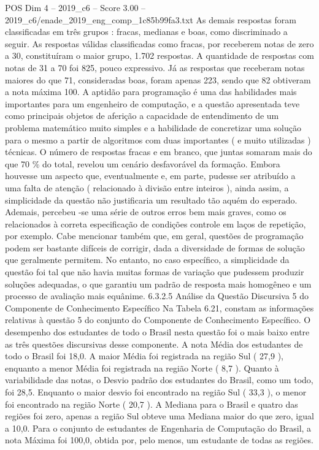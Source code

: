 \begin{textsample}{POS Dim 4 – 2019\_c6 – Score 3.00 – 2019\_c6/enade\_2019\_eng\_comp\_1c85b99fa3.txt}
As demais respostas foram classificadas em três grupos : fracas, medianas e boas, como discriminado a seguir.
As respostas válidas classificadas como fracas, por receberem notas de zero a 30, constituíram o maior grupo, 1.702 respostas.
A quantidade de respostas com notas de 31 a 70 foi 825, pouco expressivo.
Já as respostas que receberam notas maiores do que 71, consideradas boas, foram apenas 223, sendo que 82 obtiveram a nota máxima 100.
A aptidão para programação é uma das habilidades mais importantes para um engenheiro de computação, e a questão apresentada teve como principais objetos de aferição a capacidade de entendimento de um problema matemático muito simples e a habilidade de concretizar uma solução para o mesmo a partir de algoritmos com duas importantes ( e muito utilizadas ) técnicas.
O número de respostas fracas e em branco, que juntas somaram mais do que 70 \% do total, revelou um cenário desfavorável da formação.
Embora houvesse um aspecto que, eventualmente e, em parte, pudesse ser atribuído a uma falta de atenção ( relacionado à divisão entre inteiros ), ainda assim, a simplicidade da questão não justificaria um resultado tão aquém do esperado.
Ademais, percebeu -se uma série de outros erros bem mais graves, como os relacionados à correta especificação de condições controle em laços de repetição, por exemplo.
Cabe mencionar também que, em geral, questões de programação podem ser bastante difíceis de corrigir, dada a diversidade de formas de solução que geralmente permitem.
No entanto, no caso específico, a simplicidade da questão foi tal que não havia muitas formas de variação que pudessem produzir soluções adequadas, o que garantiu um padrão de resposta mais homogêneo e um processo de avaliação mais equânime. 6.3.2.5 Análise da Questão Discursiva 5 do Componente de Conhecimento Específico Na Tabela 6.21, constam as informações relativas à questão 5 do conjunto do Componente de Conhecimento Específico.
O desempenho dos estudantes de todo o Brasil nesta questão foi o mais baixo entre as três questões discursivas desse componente.
A nota Média dos estudantes de todo o Brasil foi 18,0.
A maior Média foi registrada na região Sul ( 27,9 ), enquanto a menor Média foi registrada na região Norte ( 8,7 ).
Quanto à variabilidade das notas, o Desvio padrão dos estudantes do Brasil, como um todo, foi 28,5.
Enquanto o maior desvio foi encontrado na região Sul ( 33,3 ), o menor foi encontrado na região Norte ( 20,7 ).
A Mediana para o Brasil e quatro das regiões foi zero, apenas a região Sul obteve uma Mediana maior do que zero, igual a 10,0.
Para o conjunto de estudantes de Engenharia de Computação do Brasil, a nota Máxima foi 100,0, obtida por, pelo menos, um estudante de todas as regiões.

\end{textsample}
